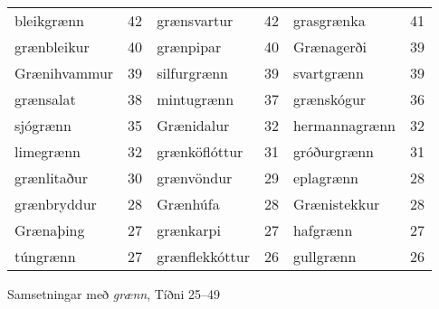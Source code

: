 \documentclass[../samsetningasafn.tex]{subfiles}
\begin{document}
\begin{wordlist}[H]
\begin{tcolorbox}

	\setlength{\extrarowheight}{3pt}
	\begin{tabular}{BlBlBl}	
		bleikgrænn	& 42		& 
		grænsvartur	& 42		& 	
		grasgrænka	& 41		\\ 	
		grænbleikur	& 40		& 	
		grænpipar	& 40		& 
		Grænagerði	& 39		\\ 
		Grænihvammur & 39	& 
		silfurgrænn	& 39		& 
		svartgrænn	& 39		\\ 
		grænsalat	& 38		& 
		mintugrænn	& 37		& 
		grænskógur	& 36		\\ 
		sjógrænn		& 35		& 
		Grænidalur	& 32		& 
		hermannagrænn & 32	\\ 	
		limegrænn	& 32		& 
		grænköflóttur	& 31		& 	
		gróðurgrænn	& 31		\\ 	
		grænlitaður	& 30		& 	
		grænvöndur	& 29		& 	
		eplagrænn	& 28		\\ 
		grænbryddur	& 28		& 	
		Grænhúfa	& 28		& 
		Grænistekkur	& 28		\\ 	
		Grænaþing	& 27		& 
		grænkarpi	& 27		& 
		hafgrænn		& 27		\\ 
		túngrænn		& 27		& 
		grænflekkóttur & 26	& 
		gullgrænn		& 26		 	
	\end{tabular}

\end{tcolorbox}
	\caption{Samsetningar með \textit{grænn}, Tíðni 25--49}
	\label{listi:graent.25}
\end{wordlist}
\end{document}
